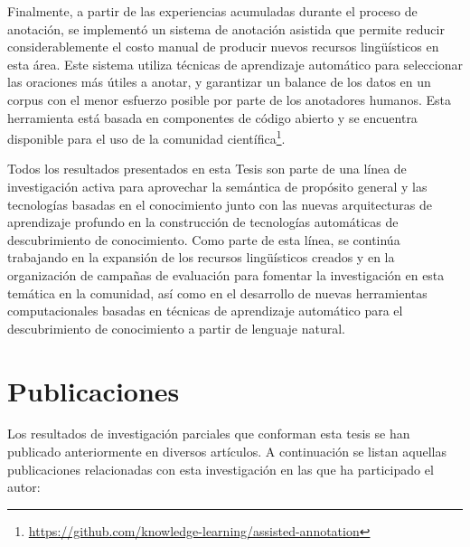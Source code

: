Finalmente, a partir de las experiencias acumuladas durante el proceso de anotación, se implementó un sistema de anotación asistida que permite reducir considerablemente el costo manual de producir nuevos recursos lingüísticos en esta área.
Este sistema utiliza técnicas de aprendizaje automático para seleccionar las oraciones más útiles a anotar, y garantizar un balance de los datos en un corpus con el menor esfuerzo posible por parte de los anotadores humanos. 
Esta herramienta está basada en componentes de código abierto y se encuentra disponible para el uso de la comunidad científica\footnote{\url{https://github.com/knowledge-learning/assisted-annotation}}.

Todos los resultados presentados en esta Tesis son parte de una línea de investigación activa para aprovechar la semántica de propósito general y las tecnologías basadas en el conocimiento junto con las nuevas arquitecturas de aprendizaje profundo en la construcción de tecnologías automáticas de descubrimiento de conocimiento.
Como parte de esta línea, se continúa trabajando en la expansión de los recursos lingüísticos creados y en la organización de campañas de evaluación para fomentar la investigación en esta temática en la comunidad, así como en el desarrollo de nuevas herramientas computacionales basadas en técnicas de aprendizaje automático para el descubrimiento de conocimiento a partir de lenguaje natural.

\section{Publicaciones}
\label{Chap:Conclusions-Publications}

Los resultados de investigación parciales que conforman esta tesis se han publicado anteriormente en diversos artículos. A continuación se listan aquellas publicaciones relacionadas con esta investigación en las que ha participado el autor:

